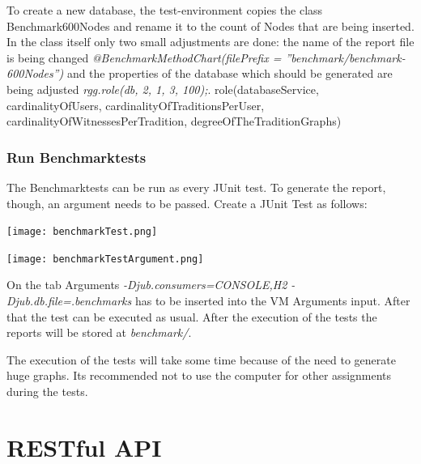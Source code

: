\documentclass[11pt,fleqn,openany]{book} %
\begin{document}
To create a new database, the test-environment copies the class Benchmark600Nodes and rename it to the count of Nodes that are being inserted. In the class itself only two small adjustments are done: the name of the report file is being changed \textit{@BenchmarkMethodChart(filePrefix = ''benchmark/benchmark-600Nodes'')} and the properties of the database which should be generated are being adjusted \textit{rgg.role(db, 2, 1, 3, 100);}. role(databaseService, cardinalityOfUsers, cardinalityOfTraditionsPerUser, cardinalityOfWitnessesPerTradition, degreeOfTheTraditionGraphs)

\section*{Run Benchmarktests}
The Benchmarktests can be run as every JUnit test. To generate the report, though, an argument needs to be passed. 
Create a JUnit Test as follows:

\begin{center}
\texttt{[image: benchmarkTest.png]} 
\end{center}

\begin{center}
\texttt{[image: benchmarkTestArgument.png]} 
\end{center}

On the tab Arguments \textit{-Djub.consumers=CONSOLE,H2 -Djub.db.file=.benchmarks} has to be inserted into the VM Arguments input. After that the test can be executed as usual. After the execution of the tests the reports will be stored at \textit{benchmark/}.
 
\begin{remark}
The execution of the tests will take some time because of the need to generate huge graphs. Its recommended not to use the computer for other assignments during the tests.  
\end{remark}



\part{RESTful API}



\end{document}
